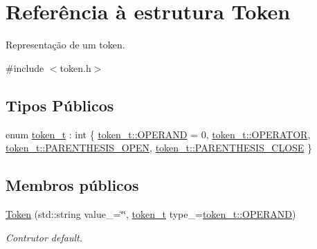\hypertarget{structToken}{}\section{Referência à estrutura Token}
\label{structToken}


Representação de um token.  




{\ttfamily \#include $<$token.\+h$>$}

\subsection*{Tipos Públicos}
\begin{DoxyCompactItemize}
\item 
enum \hyperlink{structToken_a0c0bd3a78407f44bc1fd21a9da6bd85b}{token\+\_\+t} \+: int \{ \hyperlink{structToken_a0c0bd3a78407f44bc1fd21a9da6bd85ba11f3de9b2b548c31805cf34d512ee177}{token\+\_\+t\+::\+O\+P\+E\+R\+A\+ND} = 0, 
\hyperlink{structToken_a0c0bd3a78407f44bc1fd21a9da6bd85ba986496ca5b23669b8661171566a167c3}{token\+\_\+t\+::\+O\+P\+E\+R\+A\+T\+OR}, 
\hyperlink{structToken_a0c0bd3a78407f44bc1fd21a9da6bd85bacc3fdb5e3acc094388e75f45ada1a935}{token\+\_\+t\+::\+P\+A\+R\+E\+N\+T\+H\+E\+S\+I\+S\+\_\+\+O\+P\+EN}, 
\hyperlink{structToken_a0c0bd3a78407f44bc1fd21a9da6bd85ba459697561df348fd7420e66ef9a339bf}{token\+\_\+t\+::\+P\+A\+R\+E\+N\+T\+H\+E\+S\+I\+S\+\_\+\+C\+L\+O\+SE}
 \}
\end{DoxyCompactItemize}
\subsection*{Membros públicos}
\begin{DoxyCompactItemize}
\item 
\hyperlink{structToken_a2b65ec748189e36df9bced6a12b2f46f}{Token} (std\+::string value\+\_\+=\char`\"{}\char`\"{}, \hyperlink{structToken_a0c0bd3a78407f44bc1fd21a9da6bd85b}{token\+\_\+t} type\+\_\+=\hyperlink{structToken_a0c0bd3a78407f44bc1fd21a9da6bd85ba11f3de9b2b548c31805cf34d512ee177}{token\+\_\+t\+::\+O\+P\+E\+R\+A\+ND})
\begin{DoxyCompactList}\small\item\em Contrutor default. \end{DoxyCompactList}\end{DoxyCompactItemize}
